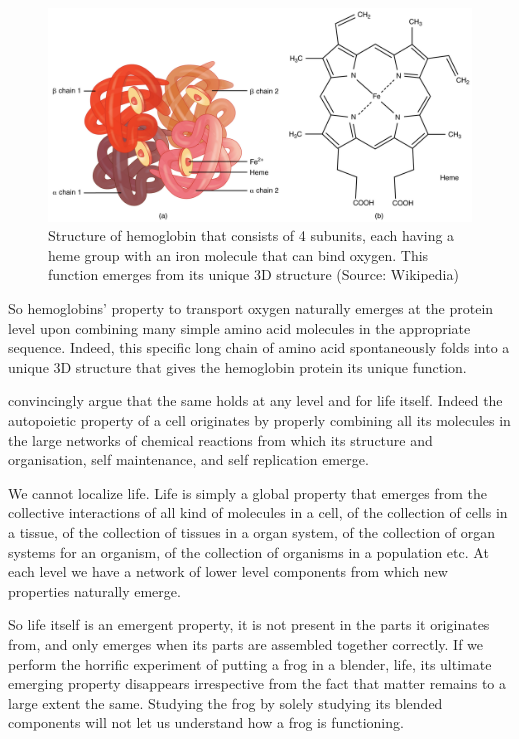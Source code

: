 \documentclass[
  11pt,
]{book}
\begin{document}
\begin{figure}

{\centering \includegraphics[width=1\linewidth]{./figs/hemoglobin} 

}

\caption{Structure of hemoglobin that consists of 4 subunits, each having a heme group with an iron molecule that can bind oxygen. This function emerges from its unique 3D structure (Source: Wikipedia)}\label{fig:hemoglobin}
\end{figure}

So hemoglobins' property to transport oxygen naturally emerges at the protein level upon combining many simple amino acid molecules in the appropriate sequence. Indeed, this specific long chain of amino acid spontaneously folds into a unique 3D structure that gives the hemoglobin protein its unique function.

\citet{capraLuisi2014} convincingly argue that the same holds at any level and for life itself. Indeed the autopoietic property of a cell originates by properly combining all its molecules in the large networks of chemical reactions from which its structure and organisation, self maintenance, and self replication emerge.

We cannot localize life. Life is simply a global property that emerges from the collective interactions of all kind of molecules in a cell, of the collection of cells in a tissue, of the collection of tissues in a organ system, of the collection of organ systems for an organism, of the collection of organisms in a population etc.
At each level we have a network of lower level components from which new properties naturally emerge.

So life itself is an emergent property, it is not present in the parts it originates from, and only emerges when its parts are assembled together correctly. If we perform the horrific experiment of putting a frog in a blender, life, its ultimate emerging property disappears irrespective from the fact that matter remains to a large extent the same. Studying the frog by solely studying its blended components will not let us understand how a frog is functioning.
\end{document}
